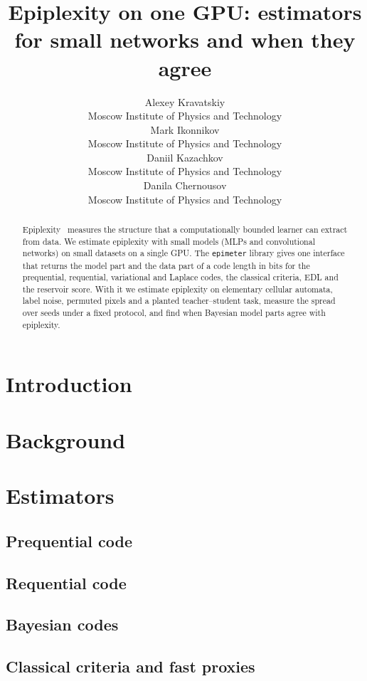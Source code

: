 \documentclass{article}
\title{Epiplexity on one GPU: estimators for small networks and when they agree}
\author{
	Alexey Kravatskiy \\
	Moscow Institute of Physics and Technology \\
	\And
	Mark Ikonnikov \\
	Moscow Institute of Physics and Technology \\
	\AND
	Daniil Kazachkov \\
	Moscow Institute of Physics and Technology \\
	\And
	Danila Chernousov \\
	Moscow Institute of Physics and Technology \\
}
\date{}
\begin{document}
\maketitle

\begin{abstract}
	Epiplexity~\citep{finzi2026epiplexity} measures the structure that a computationally bounded
	learner can extract from data. We estimate epiplexity with small models (MLPs and
	convolutional networks) on small datasets on a single GPU. The \texttt{epimeter} library
	gives one interface that returns the model part and the data part of a code length in bits
	for the prequential, requential, variational and Laplace codes, the classical criteria, EDL
	and the reservoir score. With it we estimate epiplexity on elementary cellular automata,
	label noise, permuted pixels and a planted teacher--student task, measure the spread over
	seeds under a fixed protocol, and find when Bayesian model parts agree with epiplexity.
\end{abstract}




\section{Introduction}

\section{Background}

\section{Estimators}
\subsection{Prequential code}
\subsection{Requential code}
\subsection{Bayesian codes}
\subsection{Classical criteria and fast proxies}
\end{document}
